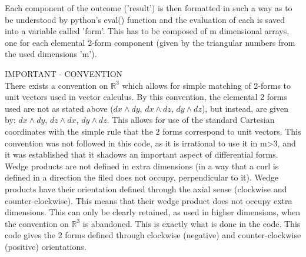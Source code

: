 \documentclass[11]{report}
\begin{document}
Each component of the outcome ('result') is then formatted in such a way as to be understood by python's eval() function and the evaluation of each is saved into a variable called 'form'. This has to be composed of m dimensional arrays, one for each elemental 2-form component (given by the triangular numbers from the used dimensions 'm').

\begin{center}
	\Large
	IMPORTANT - CONVENTION\\
	\normalsize
	There exists a convention on $\mathbb{R}^{3}$ which allows for simple matching of 2-forms to unit vectors used in vector calculus. By this convention, the elemental 2 forms used are not as stated above ($ dx \wedge dy$, $ dx \wedge dz$, $ dy \wedge dz$), but instead, are given by: $dx \wedge dy$, $ dz \wedge dx$, $ dy \wedge dz$. This allows for use of the standard Cartesian coordinates with the simple rule that the 2 forms correspond to unit vectors. This convention was not followed in this code, as it is irrational to use it in m>3, and it was established that it shadows an important aspect of differential forms. Wedge products are not defined in extra dimensions (in a way that a curl is defined in a direction the filed does not occupy, perpendicular to it). Wedge products have their orientation defined through the axial sense (clockwise and counter-clockwise). This means that their wedge product does not occupy extra dimensions. This can only be clearly retained, as used in higher dimensions, when the convention on $\mathbb{R}^{3}$ is abandoned. This is exactly what is done in the code. This code gives the 2 forms defined through clockwise (negative) and counter-clockwise (positive) orientations.
\end{center}
\end{document}
